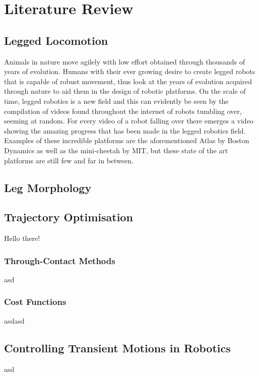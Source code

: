 \chapter{Literature Review} \label{lit review}

\section{Legged Locomotion}
Animals in nature move agilely with low effort obtained through thousands of years of evolution. Humans with their ever growing desire to create legged robots that is capable of robust movement, thus look at the years of evolution acquired through nature to aid them in the design of robotic platforms. On the scale of time, legged robotics is a new field and this can evidently be seen by the compilation of videos found throughout the internet of robots tumbling over, seeming at random. For every video of a robot falling over there emerges a video showing the amazing progress that has been made in the legged robotics field. Examples of these incredible platforms are the aforementioned Atlas by Boston Dynamics as well as the mini-cheetah by MIT, but these state of the art platforms are still few and far in between.

\section{Leg Morphology}

\section{Trajectory Optimisation}
Hello there!

    \subsection{Through-Contact Methods}
    asd

    \subsection{Cost Functions}
    asdasd
    
\section{Controlling Transient Motions in Robotics}
asd